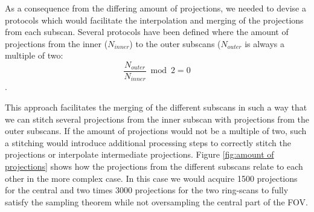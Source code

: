 As a consequence from the differing amount of projections, we needed to devise a protocols which would facilitate the interpolation and merging of the projections from each subscan. Several protocols have been defined where the amount of projections from the inner ($N_{inner}$) to the outer subscans ($N_{outer}$ is always a multiple of two:\[\frac{N_{outer}}{N_{inner}} \bmod 2 = 0\].

This approach facilitates the merging of the different subscans in such a way that we can stitch several projections from the inner subscan with projections from the outer subscans. If the amount of projections would not be a multiple of two, such a stitching would introduce additional processing steps to correctly stitch the projections or interpolate intermediate projections. \cbend Figure \ref{fig:amount of projections} shows how the projections from the different subscans relate to each other in the more complex case. In this case we would acquire 1500 projections for the central and two times 3000 projections for the two ring-scans to fully satisfy the sampling theorem while not oversampling the central part of the FOV. 

\begin{figure*}[htp]
	\centering
	\caption[Number of merged projections for one central- and two ring-scan.]{Number of merged projections for one central- and two ring-scan. We assume that we have obtained 1500 projections for the central scan and thus acquire two times 1500 projections for each of the lateral scans. This enables us to stitch the projections $P_{1_{284}}$ %
 		(red line) from subscan 1 (ring scan, red area), projection $P_{2_{142}}$ %
 		(green line) from subscan 2 (central scan, green area) and projection $P_{3_{283}}$ %
 		(blue line) of subscan 3 (ring scan, blue area) to one big projection $P_{merge_{284}}$ %
		which covers the full FOV. The areas of the three subscans overlap slightly as described above to account for variations in positioning. For illustration purposes we shifted the central projection (green) by \SI{2}{\degree}, otherwise the overlap between these particular projection would not be visible.}%
	\label{fig:amount of projections}%
\end{figure*}

\cbstart
